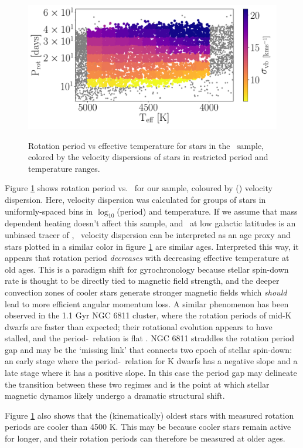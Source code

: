 \begin{figure}
  \caption{
Rotation period vs effective temperature for stars in the \mct\ sample,
    colored by the velocity dispersions of stars in restricted period and
    temperature ranges.
}
  \centering
    \includegraphics[width=1\textwidth]{dispersion_period_teff}
\label{fig:dispersion_period_teff}
\end{figure}
Figure \ref{fig:dispersion_period_teff} shows rotation period vs. \teff\ for
our sample, coloured by (\vb) velocity dispersion.
Here, velocity dispersion was calculated for groups of stars in
uniformly-spaced bins in $\log_{10}$(period) and temperature.
If we assume that mass dependent heating doesn't affect this sample, and \vb\
at low galactic latitudes is an unbiased tracer of \vz, \vb\ velocity
dispersion can be interpreted as an age proxy and stars plotted in a similar
color in figure \ref{fig:dispersion_period_teff} are similar ages.
Interpreted this way, it appears that rotation period {\it decreases} with
decreasing effective temperature at old ages.  This is a paradigm shift
for gyrochronology because stellar spin-down rate is thought to be directly
tied to magnetic field strength, and the deeper convection zones of cooler
stars generate stronger magnetic fields which {\it should} lead to more
efficient angular momentum loss.
A similar phenomenon has been observed in the 1.1 Gyr NGC 6811 cluster, where
the rotation periods of mid-K dwarfs are faster than expected; their
rotational evolution appears to have stalled, and the period-\teff\ relation
is flat \citep{curtis2019}.
NGC 6811 straddles the rotation period gap and may be the `missing link' that
connects two epoch of stellar spin-down: an early stage where the
period-\teff\ relation for K dwarfs has a negative slope and a late stage
where it has a positive slope.
In this case the period gap may delineate the transition between these two
regimes and is the point at which stellar magnetic dynamos likely undergo a
dramatic structural shift.

Figure \ref{fig:dispersion_period_teff} also shows that the (kinematically)
oldest stars with measured rotation periods are cooler than 4500 K.
This may be because cooler stars remain active for longer, and their rotation
periods can therefore be measured at older ages.

